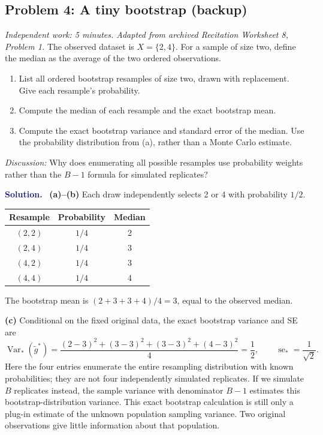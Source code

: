 \documentclass[11pt]{article}
\newcommand{\rv}[1]{\widetilde{#1}}
\newcommand{\Var}{\operatorname{Var}}
\newcommand{\se}{\operatorname{se}}
\newenvironment{answer}{\par\medskip\noindent\textcolor{MidnightBlue}{\textbf{Solution.}}\ }{\par\medskip}
\newcommand{\workingspace}[1]{}
\newcommand{\workingspace}[1]{\vspace{#1}}
\begin{document}
\newpage
\subsection*{Problem 4: A tiny bootstrap (backup)}
\noindent\textit{Independent work: 5 minutes. Adapted from archived Recitation
Worksheet 8, Problem 1.}
The observed dataset is $X=\{2,4\}$. For a sample of size two, define the
median as the average of the two ordered observations.
\begin{enumerate}
 \item List all ordered bootstrap resamples of size two, drawn with replacement.
 Give each resample's probability.
 \item Compute the median of each resample and the exact bootstrap mean.
 \item Compute the exact bootstrap variance and standard error of the median.
 Use the probability distribution from (a), rather than a Monte Carlo estimate.
\end{enumerate}
\noindent\textit{Discussion:} Why does enumerating all possible resamples use
probability weights rather than the $B-1$ formula for simulated replicates?
\workingspace{10cm}
\begin{answer}
\textbf{(a)--(b)} Each draw independently selects 2 or 4 with probability $1/2$.
\begin{center}
\begin{tabular}{@{}ccc@{}}
\toprule Resample & Probability & Median\\\midrule
$(2,2)$ & $1/4$ & 2\\
$(2,4)$ & $1/4$ & 3\\
$(4,2)$ & $1/4$ & 3\\
$(4,4)$ & $1/4$ & 4\\\bottomrule
\end{tabular}
\end{center}
The bootstrap mean is $(2+3+3+4)/4=3$, equal to the observed median.

\textbf{(c)} Conditional on the fixed original data, the exact bootstrap
variance and SE are
\[
 \boxed{\Var_*(\rv g^*)=\frac{(2-3)^2+(3-3)^2+(3-3)^2+(4-3)^2}{4}
 =\frac12,\qquad \se_*=\frac1{\sqrt2}.}
\]
Here the four entries enumerate the entire resampling distribution with
known probabilities; they are not four independently simulated replicates.
If we simulate $B$ replicates instead, the sample variance with denominator
$B-1$ estimates this bootstrap-distribution variance.
This exact bootstrap calculation is still only a plug-in estimate of the
unknown population sampling variance. Two original observations give little
information about that population.
\end{answer}
\end{document}
